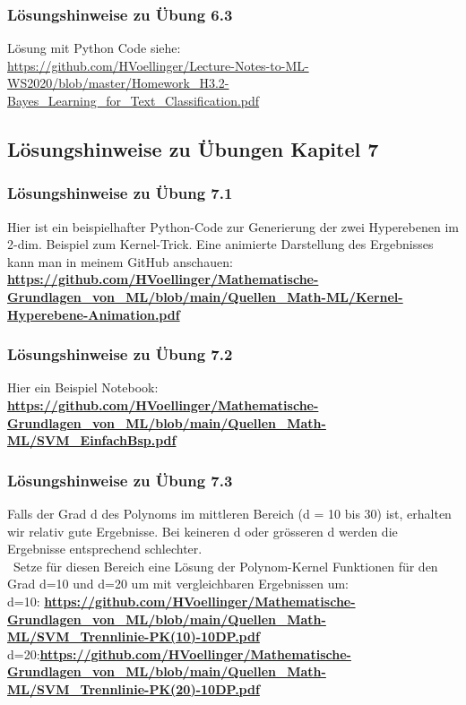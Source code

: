 \documentclass[12pt]{article}
\begin{document}
\subsubsection{Lösungshinweise zu Übung 6.3}

Lösung mit Python Code siehe:\\
\url{https://github.com/HVoellinger/Lecture-Notes-to-ML-WS2020/blob/master/Homework_H3.2-Bayes_Learning_for_Text_Classification.pdf}
\\[0.2cm]

\newpage

\subsection{Lösungshinweise zu Übungen Kapitel 7}

\subsubsection{Lösungshinweise zu Übung 7.1}
Hier ist ein beispielhafter Python-Code zur Generierung der zwei Hyperebenen im 2-dim. Beispiel zum Kernel-Trick. Eine animierte Darstellung des Ergebnisses kann man in meinem GitHub anschauen: \\[0.2cm]
\textbf{\url{https://github.com/HVoellinger/Mathematische-Grundlagen_von_ML/blob/main/Quellen_Math-ML/Kernel-Hyperebene-Animation.pdf}}
%
\subsubsection{Lösungshinweise zu Übung 7.2}
Hier ein Beispiel Notebook:\\[0.2cm]
\textbf{\url{https://github.com/HVoellinger/Mathematische-Grundlagen_von_ML/blob/main/Quellen_Math-ML/SVM_EinfachBsp.pdf}}
%
\subsubsection{Lösungshinweise zu Übung 7.3}
Falls der Grad d des Polynoms im mittleren Bereich (d = 10 bis 30) ist, erhalten wir relativ gute Ergebnisse. Bei keineren d oder grösseren d werden die Ergebnisse entsprechend schlechter.\\\
Setze für diesen Bereich eine Lösung der Polynom-Kernel Funktionen für den Grad d=10 und d=20 um mit vergleichbaren Ergebnissen um:\\[0.2cm]
%
d=10: \textbf{\url{https://github.com/HVoellinger/Mathematische-Grundlagen_von_ML/blob/main/Quellen_Math-ML/SVM_Trennlinie-PK(10)-10DP.pdf}}\\[0.2cm]
%
d=20:\textbf{\url{https://github.com/HVoellinger/Mathematische-Grundlagen_von_ML/blob/main/Quellen_Math-ML/SVM_Trennlinie-PK(20)-10DP.pdf}}
\end{document}

